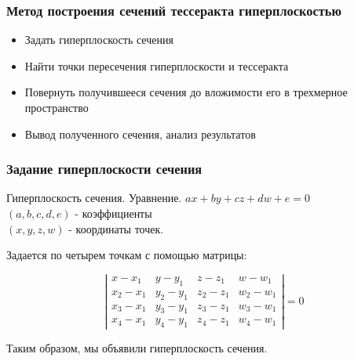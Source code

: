 \documentclass[10pt,pdf,hyperref={unicode}]{beamer}
\begin{document}
\begin{frame}
\begin{columns}
	\end{columns}
\end{frame}
\begin{frame}
	\frametitle{Метод построения сечений тессеракта гиперплоскостью}
	\begin{itemize}
		\item Задать гиперплоскость сечения
		\item Найти точки пересечения гиперплоскости и тессеракта
		\item Повернуть получившееся сечения до вложимости его в трехмерное пространство
		\item Вывод полученного сечения, анализ результатов
	\end{itemize}
\end{frame}
\begin{frame}
	\frametitle{Задание гиперплоскости сечения}
	\begin{block}{Гиперплоскость сечения. Уравнение.}
		{\bfseries $ax+by+cz+dw+e=0$} \\ $(a,b,c,d,e)$ - коэффициенты\\  $(x,y,z,w)$ - координаты точек.
	\end{block}
	Задается по четырем точкам с помощью матрицы: \\

	\begin{flushleft}
	$$ \left|
	\begin{array}{cccc}
		x-x_1 & y-y_1 & z-z_1 & w-w_1     \\
		x_2-x_1 & y_2-y_1 & z_2-z_1 & w_2-w_1    \\
		x_3-x_1 & y_3-y_1 & z_3-z_1 & w_3-w_1      \\
		x_4-x_1 & y_4-y_1 & z_4-z_1 & w_4-w_1 
	\end{array}
	\right|=0
	$$
\end{flushleft}
						
 Таким образом, мы объявили гиперплоскость сечения.

\end{frame}
\end{document}
